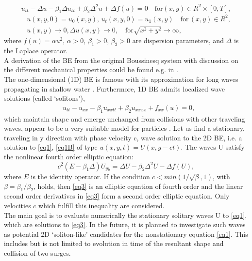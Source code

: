 \documentclass[12pt]{article}
\theoremstyle{theorem}
\theoremstyle{defi}
\begin{document}
\begin{equation}
u_{tt} - \Delta u -\beta_1  \Delta u_{tt} +\beta_2 \Delta ^2 u + \Delta f(u)=0 \quad \text{for} (x,y) \in R^2 \times [0,T] ,\label{eq1}
\end{equation}
\begin{equation}\label{eq1B}
\begin{split}
&u(x,y,0)=u_0(x,y), \, u_t(x,y,0)=u_1(x,y)   \quad\text{for} \, (x,y) \in R^2, \\
&u(x,y) \rightarrow 0,  \Delta u(x,y) \rightarrow 0 ,  \quad \text{for}  \sqrt{x^2 + y^2} \rightarrow \infty, 
\end{split}
\end{equation}
where   $f(u)=\alpha u^2$,  $\alpha>0$, $\beta_1>0$, $\beta_2>0$  are dispersion parameters, and $\Delta$ is the Laplace operator. 
\\
A derivation of the BE from the original Boussinesq system with discussion on the different mechanical properties could be found e.g. in \cite{ref1}. 
\\
The one-dimensional (1D) BE is famous with its approximation for long waves propagating in shallow water \cite{ref2, ref3}. Furthermore, 1D BE admits localized wave solutions (called ‘solitons’), 
\begin{align}
&u_{tt} - u_{xx} -\beta_1  u_{xxtt} +\beta_2 u_{xxxx} + f_{xx}(u) =0, \label{eq2}
\end{align}
which maintain shape and emerge unchanged from collisions with other traveling waves, appear to be a very suitable model for particles \cite{ref4, ref5}.
Let us find a stationary, traveling in y direction with phase velocity c, wave solution to the 2D BE, i.e. a solution to \eqref{eq1}, \eqref{eq1B} of type $u(x,y,t)=U(x,y - ct)$. The waves U satisfy the nonlinear fourth order elliptic equation:
\begin{equation}
c^2 (E-\beta_1 \Delta) U_{yy} = \Delta U -\beta_2 \Delta^2 U - \Delta f(U), \label{eq3}
\end{equation}
where $E$ is the identity operator. If the condition  $c<min(1/\sqrt{\beta}, 1)$, with $\beta = \beta_1/\beta_2$,   holds, then \eqref{eq3} is an elliptic equation of fourth order and the linear second order derivatives in \eqref{eq3} form a second order elliptic equation. Only velocities $c$ which fulfill this inequality are considered.
\\
 The main goal is to evaluate numerically the stationary solitary waves U to \eqref{eq1}, which are solutions to \eqref{eq3}. In the future, it is planned to investigate such waves as potential 2D  ‘soliton-like’ candidates for the nonstationary equation \eqref{eq1}. This includes but is not limited to evolution in time of the resultant shape and collision of two surges.
\end{document}
